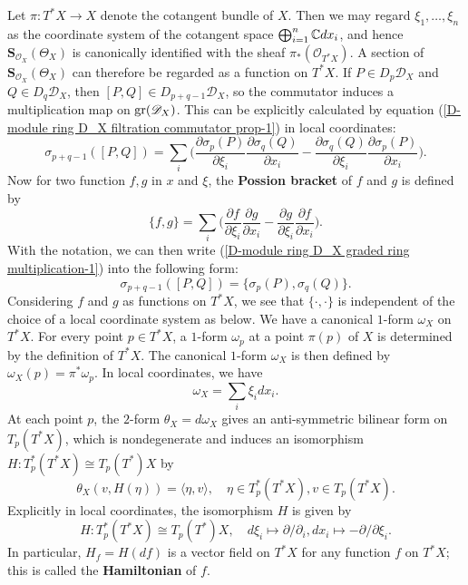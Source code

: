 Let $\pi:T^*X\to X$ denote the cotangent bundle of $X$. Then we may regard $\xi_1,\dots,\xi_n$ as the coordinate system of the cotangent space $\bigoplus_{i=1}^{n}\mathbb{C} dx_i$, and hence $\bm{S}_{\mathscr{O}_X}(\Theta_X)$ is canonically identified with the sheaf $\pi_*(\mathscr{O}_{T^*X})$. A section of $\bm{S}_{\mathscr{O}_X}(\Theta_X)$ can therefore be regarded as a function on $T^*X$. If $P\in D_p\mathscr{D}_X$ and $Q\in D_q\mathscr{D}_X$, then $[P,Q]\in D_{p+q-1}\mathscr{D}_X$, so the commutator induces a multiplication map on $\mathrm{gr}(\mathscr{D}_X)$. This can be explicitly calculated by equation (\ref{D-module ring D_X filtration commutator prop-1}) in local coordinates:
\begin{equation}\label{D-module ring D_X graded ring multiplication-1}
\sigma_{p+q-1}([P,Q])=\sum_i\Big(\frac{\partial \sigma_p(P)}{\partial\xi_i}\frac{\partial\sigma_q(Q)}{\partial x_i}-\frac{\partial \sigma_q(Q)}{\partial\xi_i}\frac{\partial\sigma_p(P)}{\partial x_i}\Big).
\end{equation}
Now for two function $f,g$ in $x$ and $\xi$, the \textbf{Possion bracket} of $f$ and $g$ is defined by
\begin{equation}\label{D-module ring D_X graded ring multiplication-2}
\{f,g\}=\sum_i\Big(\frac{\partial f}{\partial\xi_i}\frac{\partial g}{\partial x_i}-\frac{\partial g}{\partial\xi_i}\frac{\partial f}{\partial x_i}\Big).
\end{equation}
With the notation, we can then write (\ref{D-module ring D_X graded ring multiplication-1}) into the following form:
\begin{equation}\label{D-module ring D_X graded ring multiplication-3}
\sigma_{p+q-1}([P,Q])=\{\sigma_p(P),\sigma_q(Q)\}.
\end{equation}
Considering $f$ and $g$ as functions on $T^*X$, we see that $\{\cdot,\cdot\}$ is independent of the choice of a local coordinate system as below. We have a canonical $1$-form $\omega_X$ on $T^*X$. For every point $p\in T^*X$, a $1$-form $\omega_p$ at a point $\pi(p)$ of $X$ is determined by the definition of $T^*X$. The canonical $1$-form $\omega_X$ is then defined by $\omega_X(p)=\pi^*\omega_p$. In local coordinates, we have
\[\omega_X=\sum_i\xi_idx_i.\]
At each point $p$, the $2$-form $\theta_X=d\omega_X$ gives an anti-symmetric bilinear form on $T_p(T^*X)$, which is nondegenerate and induces an isomorphism $H:T_p^*(T^*X)\cong T_p(T^*)X$ by
\[\theta_X(v,H(\eta))=\langle\eta,v\rangle,\quad \eta\in T_p^*(T^*X),v\in T_p(T^*X).\]
Explicitly in local coordinates, the isomorphism $H$ is given by
\begin{equation}\label{D-module Hamiltonian on T^*X formula}
H:T_p^*(T^*X)\cong T_p(T^*)X,\quad d\xi_i\mapsto\partial/\partial_i,dx_i\mapsto -\partial/\partial\xi_i.
\end{equation}
In particular, $H_f=H(df)$ is a vector field on $T^*X$ for any function $f$ on $T^*X$; this is called the \textbf{Hamiltonian} of $f$.

